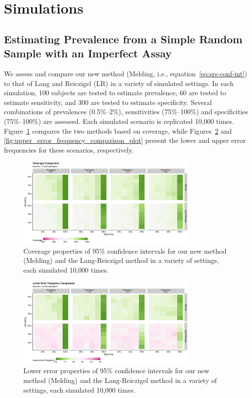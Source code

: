 \documentclass[AMA,STIX1COL]{WileyNJD-v2}
\begin{document}
\section{Simulations}

\subsection{Estimating Prevalence from a Simple Random Sample with an Imperfect Assay}

We assess and compare our new method (Melding, i.e., equation~\ref{eq:srs-conf-int}) to that of Lang and Reiczigel (LR) in a variety of simulated settings.
In each simulation, 100 subjects are tested to estimate prevalence, 60 are tested to estimate sensitivity, and 300 are tested to estimate specificity.
Several combinations of prevalences (0.5\%--2\%), sensitivities (75\%--100\%) and specificities (75\%--100\%) are assessed.
Each simulated scenario is replicated 10,000 times.
Figure~\ref{fig:coverage_comparison_plot} compares the two methods based on coverage, while Figures~\ref{fig:lower_error_frequency_comparison_plot} and \ref{fig:upper_error_frequency_comparison_plot} present the lower and upper error frequencies for these scenarios, respectively.

\begin{figure}
    \centering
    \includegraphics[width=0.8\textwidth]{figures/simple_coverage_comparison_plot.pdf}
    \caption{Coverage properties of 95\% confidence intervals for our new method (Melding) and the Lang-Reiczigel method in a variety of settings, each simulated 10,000 times.}
    \label{fig:coverage_comparison_plot}
\end{figure}

\begin{figure}
    \centering
    \includegraphics[width=0.8\textwidth]{figures/simple_lower_error_frequency_comparison_plot.pdf}
    \caption{Lower error properties of 95\% confidence intervals for our new method (Melding) and the Lang-Reiczigel method in a variety of settings, each simulated 10,000 times.}
    \label{fig:lower_error_frequency_comparison_plot}
\end{figure}
\end{document}
